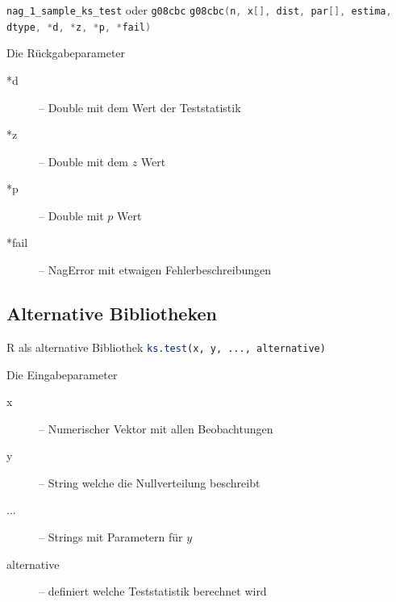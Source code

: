 \documentclass{beamer}
\begin{document}
\begin{frame}[fragile]{\insertsubsection}
\begin{block}{\lstinline[language=C++]$nag_1_sample_ks_test$ oder \lstinline[language=C++]$g08cbc$}
	\lstinline[language=C++]$g08cbc(n, x[], dist, par[], estima, dtype, *d, *z, *p, *fail)$
\end{block}
\begin{block}{Die Rückgabeparameter}
	\begin{description}
		\item[*d] -- Double mit dem Wert der Teststatistik
		\item[*z] -- Double mit dem $z$ Wert
		\item[*p] -- Double mit $p$ Wert
		\item[*fail] -- NagError mit etwaigen Fehlerbeschreibungen
	\end{description}
\end{block}
\end{frame}

\subsection{Alternative Bibliotheken}
\begin{frame}{\insertsubsection}

\begin{block}{R als alternative Bibliothek}
	\lstinline[language=R] $ks.test(x, y, ..., alternative)$
\end{block}

\begin{block}{Die Eingabeparameter}
\begin{description}
	\item[x] -- Numerischer Vektor mit  allen Beobachtungen
	\item[y] -- String welche die Nullverteilung beschreibt
	\item[...]-- Strings mit Parametern für $y$
	\item[alternative]-- definiert welche Teststatistik berechnet wird
\end{description}
\end{block}

\end{frame}
\end{document}
